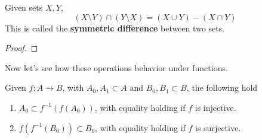 \documentclass{article}
\begin{document}
    \begin{corollary}
      Given sets $X, Y$, 
      \begin{equation}
        (X \setminus Y) \cap (Y \setminus X) = (X \cup Y) - (X \cap Y)
      \end{equation}
      This is called the \textbf{symmetric difference} between two sets. 
    \end{corollary}
    \begin{proof}
      
    \end{proof} 

    Now let's see how these operations behavior under functions. 

    \begin{theorem}
      Given $f: A \rightarrow B$, with $A_0, A_1 \subset A$ and $B_0, B_1 \subset B$, the following hold 
      \begin{enumerate}
        \item $A_0 \subset f^{-1} (f(A_0))$, with equality holding if $f$ is injective. 
        \item $f(f^{-1}(B_0)) \subset B_0$, with equality holding if $f$ is surjective. 
      \end{enumerate}
    \end{theorem} 
\end{document}
